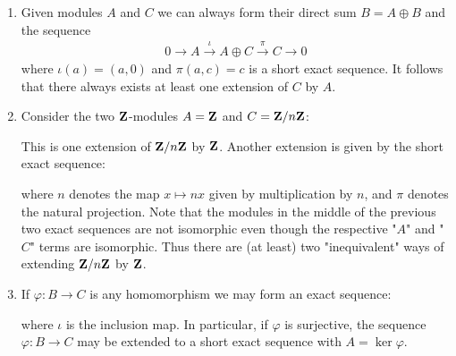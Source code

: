     \begin{example}
        \phantom{a}
        \begin{enumerate}[label = (\arabic*)]
            \item Given modules $A$ and $C$ we can always form their direct sum $B = A \oplus B$ and the sequence
                \begin{equation*}
                \begin{split}
                    0 \rightarrow A \xrightarrow{\iota} A\oplus C \xrightarrow{\pi} C \rightarrow 0
                \end{split}
                \end{equation*}
            where $\iota(a) = (a,0)$ and $\pi(a,c) = c$ is a short exact sequence. It follows that there always exists at least one extension of $C$ by $A$.

            \item Consider the two $\mathbf{Z}$-modules $A = \mathbf{Z}$ and $C = \mathbf{Z}/n\mathbf{Z}$:
                \begin{center}
                \end{center}
            This is one extension of $\mathbf{Z}/n\mathbf{Z}$ by $\mathbf{Z}$. Another extension is given by the short exact sequence:
                \begin{center}
                \end{center}
            where $n$ denotes the map $x \mapsto nx$ given by multiplication by $n$, and $\pi$ denotes the natural projection. Note that the modules in the middle of the previous two exact sequences are not isomorphic even though the respective "$A$" and "$C$" terms are isomorphic. Thus there are (at least) two "inequivalent" ways of extending $\mathbf{Z}/n\mathbf{Z}$ by $\mathbf{Z}$.

            \item If $\varphi:B \rightarrow C$ is any homomorphism we may form an exact sequence:
                \begin{center}
                \end{center}
            where $\iota$ is the inclusion map. In particular, if $\varphi$ is surjective, the sequence $\varphi:B \rightarrow C$ may be extended to a short exact sequence with $A = \ker{\varphi}$.


\end{enumerate}
\end{example}
